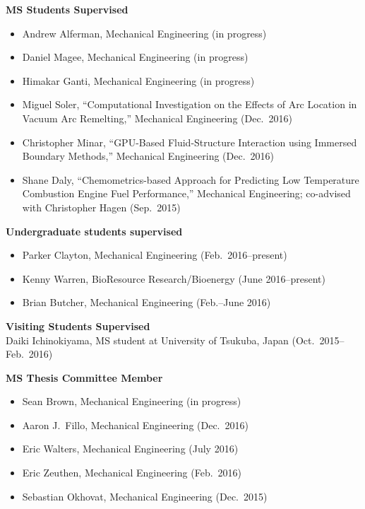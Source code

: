 \documentclass[margin,line,11pt]{res}
\begin{document}
\begin{resume}
\textbf{MS Students Supervised}
\begin{itemize}[leftmargin=*]
\item Andrew Alferman, Mechanical Engineering (in progress)
\item Daniel Magee, Mechanical Engineering (in progress)
\item Himakar Ganti, Mechanical Engineering (in progress)
\item Miguel Soler, ``Computational Investigation on the Effects of Arc Location in Vacuum Arc Remelting,'' Mechanical Engineering (Dec.\ 2016)
\item Christopher Minar, ``GPU-Based Fluid-Structure Interaction using Immersed Boundary Methods,'' Mechanical Engineering (Dec.\ 2016)
\item Shane Daly, ``Chemometrics-based Approach for Predicting Low Temperature Combustion Engine Fuel Performance,'' Mechanical Engineering; co-advised with Christopher Hagen (Sep.\ 2015)
\end{itemize}

\textbf{Undergraduate students supervised}
\begin{itemize}[leftmargin=*]
    \item Parker Clayton, Mechanical Engineering (Feb.\ 2016--present)
    \item Kenny Warren, BioResource Research\slash Bioenergy (June 2016--present)
    \item Brian Butcher, Mechanical Engineering (Feb.--June 2016)
\end{itemize}

\textbf{Visiting Students Supervised} \\
Daiki Ichinokiyama, MS student at University of Tsukuba, Japan (Oct.\ 2015--Feb.\ 2016)


\textbf{MS Thesis Committee Member}
\begin{itemize}[leftmargin=*]
\item Sean Brown, Mechanical Engineering (in progress)
\item Aaron J.~Fillo, Mechanical Engineering (Dec.\ 2016)
\item Eric Walters, Mechanical Engineering (July 2016)
\item Eric Zeuthen, Mechanical Engineering (Feb.\ 2016)
\item Sebastian Okhovat, Mechanical Engineering (Dec.\ 2015)
\end{itemize}


\end{resume}
\end{document}
